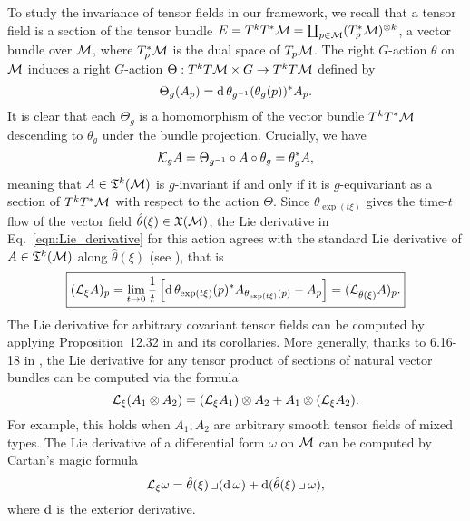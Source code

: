 \documentclass[twoside,11pt]{article}
\begin{document}
    To study the invariance of tensor fields in our framework, we recall that a tensor field is a section of the tensor bundle 
    $E = T^kT^*{\mathcal{M}} = \coprod_{p\in{\mathcal{M}}} (T_p^*{\mathcal{M}})^{\otimes k}$, a vector bundle over ${\mathcal{M}}$,
    where $T_p^*{\mathcal{M}}$ is the dual space of $T_p{\mathcal{M}}$.
    The right $G$-action $\theta$ on ${\mathcal{M}}$ induces a
    right $G$-action $\Theta: T^k T{\mathcal{M}} \times G \to T^k T{\mathcal{M}}$ defined by
    \begin{equation}
        \Theta_g(A_p) = \operatorname{\mathrm{d}} \theta_{g^{-1}}(\theta_g(p))^* A_p.
    \end{equation}
    It is clear that each $\Theta_g$ is a homomorphism of the vector bundle $T^kT^*{\mathcal{M}}$ descending to $\theta_g$ under the bundle projection.
    Crucially, we have
    \begin{equation}
        {\mathcal{K}}_g A 
        = \Theta_{g^{-1}}\circ A \circ \theta_g
        = \theta_g^* A,
    \end{equation}
    meaning that $A\in\mathfrak{T}^k({\mathcal{M}})$ is $g$-invariant if and only if it is $g$-equivariant as a section of $T^kT^*{\mathcal{M}}$ with respect to the action $\Theta$.
    Since $\theta_{\exp(t\xi)}$ gives the time-$t$ flow of the vector field $\hat{\theta}(\xi)\in\mathfrak{X}({\mathcal{M}})$, the Lie derivative in Eq.~\ref{eqn:Lie_derivative} for this action agrees with the standard Lie derivative of $A\in\mathfrak{T}^k({\mathcal{M}})$ along $\hat{\theta}(\xi)$ (see \citet[p.321]{Lee2013introduction}), that is
    \begin{equation}
    \boxed{
    ({\mathcal{L}}_{\xi} A)_p 
    = \lim_{t\to 0} \frac{1}{t}\left[ \operatorname{\mathrm{d}}\theta_{\exp(t\xi)}(p)^* A_{\theta_{\exp(t\xi)}(p)} - A_p \right]
    = ({\mathcal{L}}_{\hat{\theta}(\xi)} A)_p.
    }
    \label{eqn:Lie_derivative_for_tf}
\end{equation}
The Lie derivative for arbitrary covariant tensor fields can be computed by applying Proposition~12.32 in \cite{Lee2013introduction} and its corollaries.
More generally, thanks to 6.16-18 in \cite{Kolar1993natural}, the Lie derivative for any tensor product of sections of natural vector bundles can be computed via the formula
\begin{equation}
    {\mathcal{L}}_{\xi}(A_1\otimes A_2) = ({\mathcal{L}}_{\xi} A_1) \otimes A_2 + A_1 \otimes ({\mathcal{L}}_{\xi} A_2).
\end{equation}
For example, this holds when $A_1, A_2$ are arbitrary smooth tensor fields of mixed types.
The Lie derivative of a differential form $\omega$ on ${\mathcal{M}}$ can be computed by Cartan's magic formula
\begin{equation}
    \mcal{L}_{\xi} \omega = \hat{\theta}(\xi) \intmul (\td \omega) + \td (\hat{\theta}(\xi) \intmul \omega),
    \label{eqn:Cartan_magic_formula}
\end{equation}
where $\operatorname{\mathrm{d}}$ is the exterior derivative.
\end{document}
